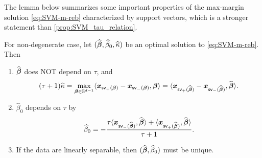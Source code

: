 The lemma below summarizes some important properties of the max-margin solution \cref{eq:SVM-m-reb} characterized by support vectors, which is a stronger statement than \cref{prop:SVM_tau_relation}.

\begin{lem}\label{lem:indep_tau}
	For non-degenerate case, let $(\widehat{{\boldsymbol{\beta}}}, \widehat\beta_0, \widehat\kappa)$ be an optimal solution to \cref{eq:SVM-m-reb}. Then
	\begin{enumerate}[label=(\alph*)]
		\item \label{lem:indep_tau(a)}
            $\widehat{{\boldsymbol{\beta}}}$ does NOT depend on $\tau$, and
		\begin{equation}\label{eq:kappa_hat}
			(\tau + 1) \widehat\kappa = 
			\max_{{\boldsymbol{\beta}} \in \mathbb{S}^{d-1}} \langle \text{\boldmath $x$}_{\mathsf{sv}_+({\boldsymbol{\beta}})} - \text{\boldmath $x$}_{\mathsf{sv}_-({\boldsymbol{\beta}})}, {\boldsymbol{\beta}} \rangle
			= 
			\langle \text{\boldmath $x$}_{\mathsf{sv}_+(\widehat{{\boldsymbol{\beta}}})} - \text{\boldmath $x$}_{\mathsf{sv}_-(\widehat{{\boldsymbol{\beta}}})}, \widehat{{\boldsymbol{\beta}}} \rangle.
		\end{equation}
		\item \label{lem:indep_tau(b)}
            $\hat\beta_0$ depends on $\tau$ by
		\begin{equation}\label{eq:beta0_hat}
			\widehat\beta_0 = -\frac{\tau \langle \text{\boldmath $x$}_{\mathsf{sv}_-(\widehat{{\boldsymbol{\beta}}})}, \widehat{{\boldsymbol{\beta}}} \rangle + \langle \text{\boldmath $x$}_{\mathsf{sv}_+(\widehat{{\boldsymbol{\beta}}})}, \widehat{{\boldsymbol{\beta}}} \rangle}{\tau + 1}.
		\end{equation}
		\item \label{lem:indep_tau(c)}
            If the data are linearly separable, then $(\widehat{{\boldsymbol{\beta}}}, \widehat\beta_0)$ must be unique.
	\end{enumerate}
\end{lem}

